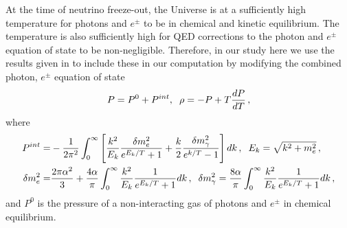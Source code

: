 At the time of neutrino freeze-out, the Universe is at a sufficiently high temperature for photons and $e^\pm$ to be in chemical and kinetic equilibrium. The temperature is also sufficiently high for QED corrections to the photon and $e^\pm$ equation of state to be non-negligible. Therefore, in our study here we use the results given in \cite{Heckler:1994tv,Mangano:2001iu} to include these in our computation by modifying the combined photon, $e^\pm$ equation of state
\begin{align}
P=P^0+P^{int},\hspace{2mm} \rho=-P+T\frac{dP}{dT}\,,
\end{align}
where
\begin{align}
P^{int}=&-\frac{1}{2\pi^2}\int_0^\infty\left[\frac{k^2}{E_k}\frac{\delta m_e^2}{e^{E_k/T}+1}+\frac{k}{2}\frac{\delta m_\gamma^2}{e^{k/T}-1}\right]dk\,,\hspace{2mm} E_k=\sqrt{k^2+m_e^2}\,,\\
\delta m_e^2=&\frac{2\pi\alpha^2}{3}+\frac{4\alpha}{\pi}\int_0^\infty \frac{k^2}{E_k}\frac{1}{e^{E_k/T}+1}dk\,,\hspace{2mm} \delta m_\gamma^2=\frac{8\alpha}{\pi}\int_0^\infty \frac{k^2}{E_k}\frac{1}{e^{E_k/T}+1}dk\,,
\end{align}
and $P^0$ is the pressure of a non-interacting gas of photons and $e^\pm$ in chemical equilibrium.

